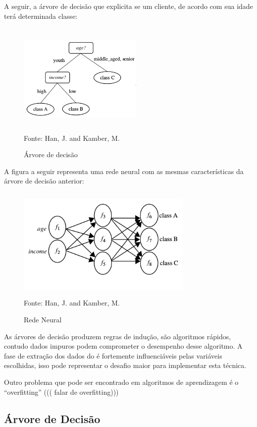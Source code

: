 A seguir, a árvore de decisão que explicita se um cliente, de acordo com sua idade terá determinada classe:
\begin{figure}[!ht]
\centering
\caption{Árvore de decisão}
\includegraphics[width=60mm, height=55mm]{Figuras/BigData/arvorejovem.png}\\
\tiny Fonte: Han, J. and Kamber, M. 
\end{figure}  

A figura a seguir representa uma rede neural com as mesmas características da árvore de decisão anterior:
\begin{figure}[!ht]
\centering
\caption{Rede Neural}
\includegraphics[width=85mm, height=55mm]{Figuras/BigData/redeneural.png}\\
\tiny Fonte: Han, J. and Kamber, M. 
\end{figure}  

As árvores de decisão produzem regras de indução, são algoritmos rápidos, contudo dados impuros podem comprometer o desempenho desse algoritmo. 
A fase de extração dos dados do é fortemente influenciáveis pelas variáveis escolhidas, \cite{DecisionTree} 
isso pode representar o desafio maior para implementar esta técnica. 

Outro problema que pode ser encontrado em algoritmos de aprendizagem é o ``overfitting'' ((( falar de overfitting)))

\pagebreak

\subsection{Árvore de Decisão}

